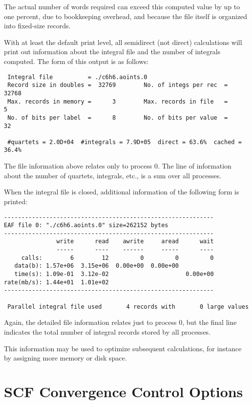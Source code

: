 The actual number of words required can 
exceed this computed value by up to one percent, due to 
bookkeeping overhead, and because the file itself is
organized into fixed-size records.

With at least the default print level, all semidirect (not direct)
calculations will print out information about the integral file and
the number of integrals computed.  The form of this output is as
follows:

\begin{verbatim}
 Integral file          = ./c6h6.aoints.0
 Record size in doubles =  32769        No. of integs per rec  =  32768
 Max. records in memory =      3        Max. records in file   =      5
 No. of bits per label  =      8        No. of bits per value  =     32

 #quartets = 2.0D+04  #integrals = 7.9D+05  direct = 63.6%  cached = 36.4%
\end{verbatim}

The file information above relates only to process 0.  The line of
information about the number of quartets, integrals, etc., is a sum
over all processes.

When the integral file is closed, additional information of the following
form is printed:

\begin{verbatim}
------------------------------------------------------------
EAF file 0: "./c6h6.aoints.0" size=262152 bytes
------------------------------------------------------------
               write      read    awrite     aread      wait
               -----      ----    ------     -----      ----
     calls:        6        12         0         0         0
   data(b): 1.57e+06  3.15e+06  0.00e+00  0.00e+00
   time(s): 1.09e-01  3.12e-02                      0.00e+00
rate(mb/s): 1.44e+01  1.01e+02
------------------------------------------------------------

 Parallel integral file used       4 records with       0 large values
\end{verbatim}
Again, the detailed file information relates just to process 0, but
the final line indicates the total number of integral records stored
by all processes. 

This information may be used to optimize subsequent calculations, for
instance by assigning more memory or disk space.

\section{SCF Convergence Control Options}
\label{sec:scfconv}

